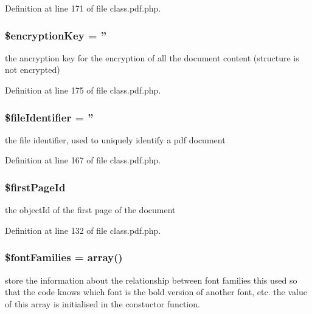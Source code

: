 \-Definition at line 171 of file class.\-pdf.\-php.

\hypertarget{class_cpdf_a730bbd8ecf60f264748611532e4c6f01}{
\subsubsection[{\$encryption\-Key}]{\setlength{\rightskip}{0pt plus 5cm}\$encryption\-Key = ''}}\label{class_cpdf_a730bbd8ecf60f264748611532e4c6f01}
the ancryption key for the encryption of all the document content (structure is not encrypted) 

\-Definition at line 175 of file class.\-pdf.\-php.

\hypertarget{class_cpdf_aaf05a37af8d9a97b51844158c9f04981}{
\subsubsection[{\$file\-Identifier}]{\setlength{\rightskip}{0pt plus 5cm}\$file\-Identifier = ''}}\label{class_cpdf_aaf05a37af8d9a97b51844158c9f04981}
the file identifier, used to uniquely identify a pdf document 

\-Definition at line 167 of file class.\-pdf.\-php.

\hypertarget{class_cpdf_a6f59caca64a9cd3619591fde1bfd443f}{
\subsubsection[{\$first\-Page\-Id}]{\setlength{\rightskip}{0pt plus 5cm}\$first\-Page\-Id}}\label{class_cpdf_a6f59caca64a9cd3619591fde1bfd443f}
the object\-Id of the first page of the document 

\-Definition at line 132 of file class.\-pdf.\-php.

\hypertarget{class_cpdf_a3632d1cfb98c70776f2bf64fefeb1292}{
\subsubsection[{\$font\-Families}]{\setlength{\rightskip}{0pt plus 5cm}\$font\-Families = array()}}\label{class_cpdf_a3632d1cfb98c70776f2bf64fefeb1292}
store the information about the relationship between font families this used so that the code knows which font is the bold version of another font, etc. the value of this array is initialised in the constuctor function. 


